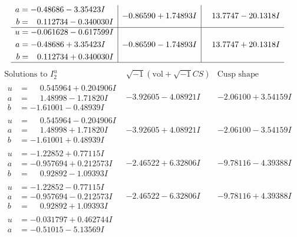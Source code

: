 \documentclass[1p]{elsarticle_modified}
\theoremstyle{definition}
\newcommand{\I}{\sqrt{-1}}
\begin{document}
$$\begin{array}{c|c|c}
\begin{aligned}
a &= -0.48686 - 3.35423 I \\
b &= \phantom{-}0.112734 - 0.340030 I\end{aligned}
 & -0.86590 + 1.74893 I & \phantom{-}13.7747 - 20.1318 I \\ \hline\begin{aligned}
u &= -0.061628 - 0.617599 I \\
a &= -0.48686 + 3.35423 I \\
b &= \phantom{-}0.112734 + 0.340030 I\end{aligned}
 & -0.86590 - 1.74893 I & \phantom{-}13.7747 + 20.1318 I\\
 \hline 
 \end{array}$$\newpage$$\begin{array}{c|c|c}  
\text{Solutions to }I^u_{2}& \I (\text{vol} + \sqrt{-1}CS) & \text{Cusp shape}\\
 \hline 
\begin{aligned}
u &= \phantom{-}0.545964 + 0.204906 I \\
a &= \phantom{-}1.48998 - 1.71820 I \\
b &= -1.61001 - 0.48939 I\end{aligned}
 & -3.92605 - 4.08921 I & -2.06100 + 3.54159 I \\ \hline\begin{aligned}
u &= \phantom{-}0.545964 - 0.204906 I \\
a &= \phantom{-}1.48998 + 1.71820 I \\
b &= -1.61001 + 0.48939 I\end{aligned}
 & -3.92605 + 4.08921 I & -2.06100 - 3.54159 I \\ \hline\begin{aligned}
u &= -1.22852 + 0.77115 I \\
a &= -0.957694 + 0.212573 I \\
b &= \phantom{-}0.92892 - 1.09393 I\end{aligned}
 & -2.46522 + 6.32806 I & -9.78116 - 4.39388 I \\ \hline\begin{aligned}
u &= -1.22852 - 0.77115 I \\
a &= -0.957694 - 0.212573 I \\
b &= \phantom{-}0.92892 + 1.09393 I\end{aligned}
 & -2.46522 - 6.32806 I & -9.78116 + 4.39388 I \\ \hline\begin{aligned}
u &= -0.031797 + 0.462744 I \\
a &= -0.51015 - 5.13569 I \\

\end{aligned}
\end{array}$$
\end{document}

